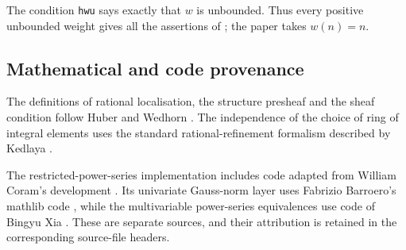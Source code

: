 \documentclass[11pt,reqno]{amsart}
\theoremstyle{definition}
\begin{document}
The condition \texttt{hwu} says exactly that \(w\) is unbounded.  Thus every
positive unbounded weight gives all the assertions of
; the paper takes \(w(n)=n\).

\subsection{Mathematical and code provenance}

The definitions of rational localisation, the structure presheaf and the sheaf
condition follow Huber \cite{Huber94} and Wedhorn \cite{Wedhorn}.  The
independence of the choice of ring of integral elements uses the standard
rational-refinement formalism described by Kedlaya
\cite[Lemma~1.6.8 and Remark~1.6.9]{KedlayaAWS}.

The restricted-power-series implementation includes code adapted from William
Coram's development \cite{CoramCode}.  Its univariate Gauss-norm layer uses
Fabrizio Barroero's mathlib code \cite{BarroeroCode}, while the multivariable
power-series equivalences use code of Bingyu Xia \cite{XiaCode}.  These are
separate sources, and their attribution is retained in the corresponding
source-file headers.
\end{document}
